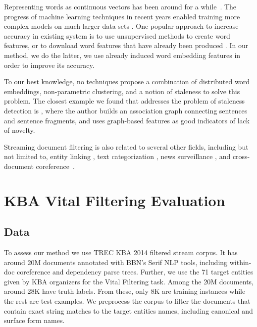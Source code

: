 \documentclass{article}
\begin{document}
Representing words as continuous vectors has been around for a while~\cite{Hinton87, Elman90findingstructure}. 
The progress of machine learning techniques in recent years enabled training more complex models on much larger data sets \cite{mikolovChen}. 
One popular approach to increase accuracy in existing system is to use unsupervised methods to create word features, or to download word features that have already been produced \cite{Turian10wordrepresentations}. In our method, we do the latter, we use already induced word embedding features in order to improve its accuracy.

To our best knowledge, no techniques propose a combination of distributed word embeddings, non-parametric clustering, and a notion of staleness to solve this problem. 
The closest example we found that addresses the problem of staleness detection is \citet{gamon}, where the author builds an association graph connecting sentences and sentence fragments, and uses graph-based features as good indicators of lack of novelty.

Streaming document filtering is also related to several other fields, including but not limited to, entity linking \cite{KBP11}, text categorization \cite{HLTCOE12}, news surveillance \cite{Steinberger14}, and cross-document coreference~\cite{RaoMD10,singh11:acl}.

\section{KBA Vital Filtering Evaluation}
\label{evaluation}

\subsection{Data}
\label{data}

To assess our method we use TREC KBA 2014 filtered stream corpus. It has around 20M documents annotated with BBN's Serif NLP tools, including within-doc coreference and dependency parse trees. Further, we use the 71 target entities given by KBA organizers for the Vital Filtering task. Among the 20M documents, around 28K have truth labels. From these, only 8K are training instances while the rest are test examples.
We preprocess the corpus to filter the documents that contain exact string matches to the target entities names, including canonical and surface form names.
\end{document}
